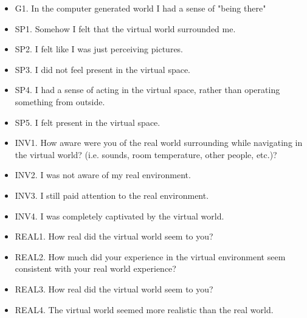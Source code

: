 \begin{itemize}
    \item G1. In the computer generated world I had a sense of "being there"
    \item SP1. Somehow I felt that the virtual world surrounded me.
    \item SP2. I felt like I was just perceiving pictures.
    \item SP3. I did not feel present in the virtual space.
    \item SP4. I had a sense of acting in the virtual space, rather than operating something from outside.
    \item SP5. I felt present in the virtual space.
    \item INV1. How aware were you of the real world surrounding while navigating in the virtual world? (i.e. sounds, room temperature, other people, etc.)?
    \item INV2. I was not aware of my real environment.
    \item INV3. I still paid attention to the real environment.
    \item INV4. I was completely captivated by the virtual world.
    \item REAL1. How real did the virtual world seem to you?
    \item REAL2. How much did your experience in the virtual environment seem consistent with your real world experience?
    \item REAL3. How real did the virtual world seem to you?
    \item REAL4. The virtual world seemed more realistic than the real world.
\end{itemize}